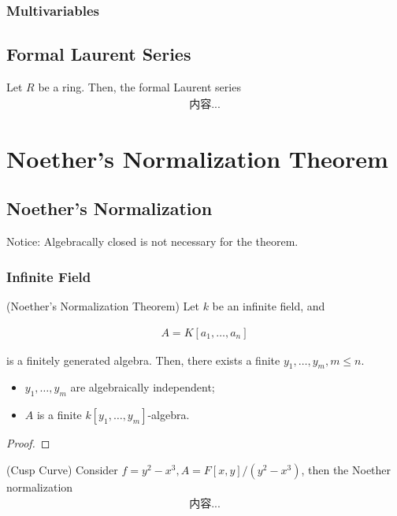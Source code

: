 \documentclass[Total.tex]{subfiles}
\begin{document}
			\subsubsection{Multivariables}
			
		\subsection{Formal Laurent Series}
			\begin{Def}
				Let $R$ be a ring. Then, the formal Laurent series
				\begin{gather*}
					内容...
				\end{gather*}
			\end{Def}
			
	\section{Noether's Normalization Theorem}
	
	
	\subsection{Noether's Normalization}
	
	Notice: Algebracally closed is not necessary for the theorem. 
	\subsubsection{Infinite Field}
	\begin{theorem}
		(Noether's Normalization Theorem)  Let $k$ be an infinite field, and 
		
		\begin{gather*}
			A=K[a_1,\dots,a_n]
		\end{gather*}
		
		is a finitely generated algebra. Then, there exists a finite $y_1,\dots,y_m,m\leq n$. 
		
		\begin{itemize}
			\item $y_1,\dots,y_m$ are algebraically independent;
			\item $A$ is a finite $k[y_1,\dots,y_m]$-algebra.
		\end{itemize}
	\end{theorem}
	
	\begin{proof}
	\end{proof}
	
	\begin{example}
		(Cusp Curve) Consider $f=y^2-x^3,A=F[x,y]/(y^2-x^3)$, then the Noether normalization
		\begin{gather*}
			内容...
		\end{gather*}
	\end{example}
	
\end{document}
